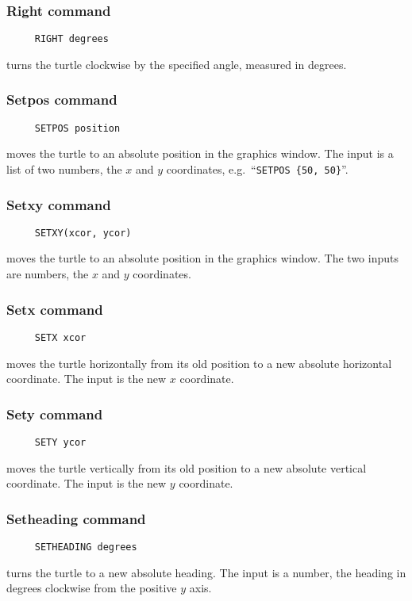 \subsubsection*{Right command}
\begin{verbatim}
     RIGHT degrees
\end{verbatim}
turns the turtle clockwise by the specified angle, measured in
degrees.

\hypertarget{logoturtle:setpos}{\subsubsection*{Setpos command}}
\begin{verbatim}
     SETPOS position
\end{verbatim}
moves the turtle to an absolute position in the graphics window.  The
input is a list of two numbers, the $x$ and $y$ coordinates,
e.g.\ ``\texttt{SETPOS \{50, 50\}}''.

\subsubsection*{Setxy command}
\begin{verbatim}
     SETXY(xcor, ycor)
\end{verbatim}
moves the turtle to an absolute position in the graphics window.  The
two inputs are numbers, the $x$ and $y$ coordinates.

\subsubsection*{Setx command}
\begin{verbatim}
     SETX xcor
\end{verbatim}
moves the turtle horizontally from its old position to a new absolute
horizontal coordinate.  The input is the new $x$ coordinate.

\subsubsection*{Sety command}
\begin{verbatim}
     SETY ycor
\end{verbatim}
moves the turtle vertically from its old position to a new absolute
vertical coordinate.  The input is the new $y$ coordinate.

\hypertarget{logoturtle:setheading}{\subsubsection*{Setheading command}}
\begin{verbatim}
     SETHEADING degrees
\end{verbatim}
turns the turtle to a new absolute heading.  The input is a number,
the heading in degrees clockwise from the positive $y$ axis.

